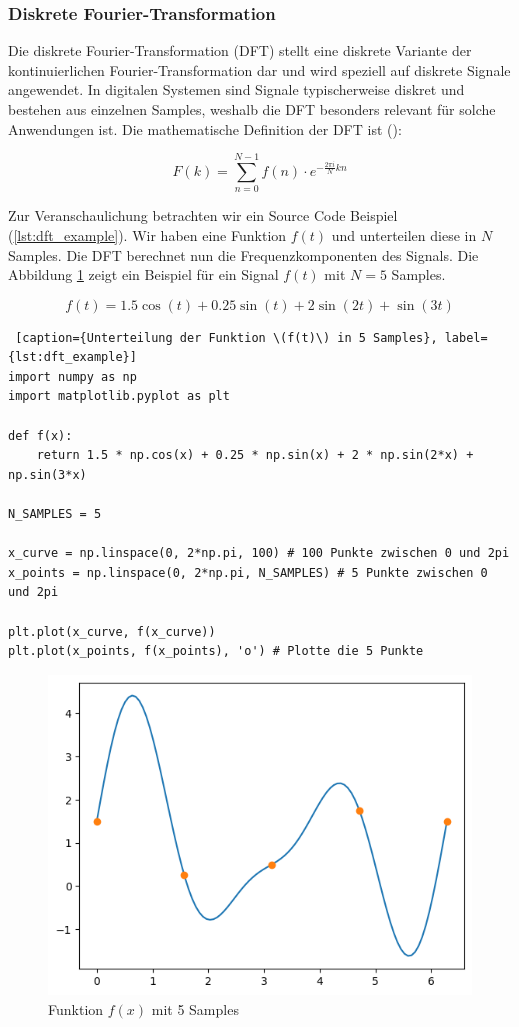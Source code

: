 \documentclass[11pt,a4paper]{article}
\newcommand{\formulas}[1]{
	\addcontentsline{equ}{formulas}{\protect\numberline{\theequation}#1}\par
}
\begin{document}
\subsubsection{Diskrete Fourier-Transformation}

Die diskrete Fourier-Transformation (DFT) stellt eine diskrete Variante der kontinuierlichen
Fourier-Transformation dar und wird speziell auf diskrete Signale angewendet. In digitalen
Systemen sind Signale typischerweise diskret und bestehen aus einzelnen Samples, weshalb die DFT
besonders relevant für solche Anwendungen ist. Die mathematische Definition der DFT ist
(\cite[Chapter~3]{hansen2014fourier}):

\begin{equation}
    F(k) = \sum_{n=0}^{N-1} f(n) \cdot e^{-\frac{2\pi i}{N} kn}
    \label{eq:fourier_series}
\end{equation}
\formulas{Fourier-Reihe}

\noindent \newline
Zur Veranschaulichung betrachten wir ein Source Code Beispiel (\ref{lst:dft_example}). 
Wir haben eine Funktion \(f(t)\) und unterteilen diese in \(N\) Samples. Die DFT berechnet nun die 
Frequenzkomponenten des Signals. Die Abbildung \ref{fig:dft_example} zeigt ein Beispiel für ein 
Signal \(f(t)\) mit \(N=5\) Samples.

\begin{equation}
    f(t) = 1.5 \cos(t) + 0.25 \sin(t) + 2 \sin(2t) + \sin(3t)
    \label{eq:example_function}
\end{equation}


\begin{lstlisting} [caption={Unterteilung der Funktion \(f(t)\) in 5 Samples}, label={lst:dft_example}]
import numpy as np
import matplotlib.pyplot as plt

def f(x):
    return 1.5 * np.cos(x) + 0.25 * np.sin(x) + 2 * np.sin(2*x) + np.sin(3*x)

N_SAMPLES = 5

x_curve = np.linspace(0, 2*np.pi, 100) # 100 Punkte zwischen 0 und 2pi
x_points = np.linspace(0, 2*np.pi, N_SAMPLES) # 5 Punkte zwischen 0 und 2pi

plt.plot(x_curve, f(x_curve))
plt.plot(x_points, f(x_points), 'o') # Plotte die 5 Punkte
\end{lstlisting}

\begin{figure}[h]
	\centering
	\includegraphics[width=0.60\linewidth]{img/dft.png}
	\caption{Funktion \( f(x) \) mit 5 Samples}
	\label{fig:dft_example}
\end{figure}
\end{document}
